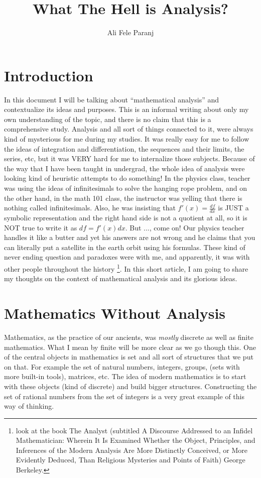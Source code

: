 \documentclass[12pt,a4paper]{article}
\title{What The Hell is Analysis?}
\author{Ali Fele Paranj}
\begin{document}
	\maketitle

	\section{Introduction}
	In this document I will be talking about ``mathematical analysis'' and contextualize its ideas and purposes. This is an informal writing about only my own understanding of the topic, and there is no claim that this is a comprehensive study. Analysis and all sort of things connected to it, were always kind of mysterious for me during my studies. It was really easy for me to follow the ideas of integration and differentiation, the sequences and their limits, the series, etc, but it was VERY hard for me to internalize those subjects. Because of the way that I have been taught in undergrad, the whole idea of analysis were looking kind of heuristic attempts to do something! In the physics class, teacher was using the ideas of infinitesimals to solve the hanging rope problem, and on the other hand, in the math 101 class, the instructor was yelling that there is nothing called infinitesimals. Also, he was insisting that $f'(x)=\frac{df}{dx}$ is JUST a symbolic representation and the right hand side is not a quotient at all, so it is NOT true to write it as $df = f'(x) dx$. But ..., come on! Our physics teacher handles it like a butter and yet his answers are not wrong and he claims that you can literally put a satellite in the earth orbit using his formulas. These kind of never ending question and paradoxes were with me, and apparently, it was with other people throughout the history \footnote{look at the book The Analyst (subtitled A Discourse Addressed to an Infidel Mathematician: Wherein It Is Examined Whether the Object, Principles, and Inferences of the Modern Analysis Are More Distinctly Conceived, or More Evidently Deduced, Than Religious Mysteries and Points of Faith) George Berkeley. }. In this short article, I am going to share my thoughts on the context of mathematical analysis and its glorious ideas.
	
	\section{Mathematics Without Analysis}
	Mathematics, as the practice of our ancients, was \emph{mostly} discrete as well as finite mathematics. What I mean by finite will be more clear as we go though this. One of the central objects in mathematics is set and all sort of structures that we put on that. For example the set of natural numbers, integers, groups, (sets with more built-in tools), matrices, etc. The idea of modern mathematics is to start with these objects (kind of discrete) and build bigger structures. Constructing the set of rational numbers from the set of integers is a very great example of this way of thinking.
\end{document}
